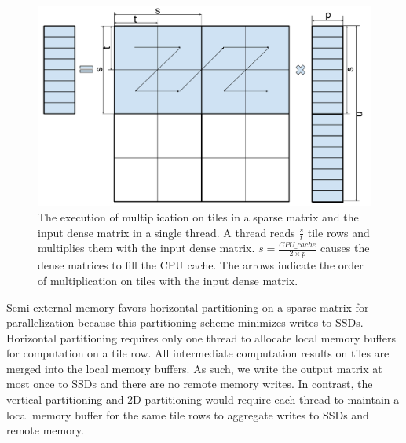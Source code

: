 \begin{figure}
\centering
\includegraphics[scale=0.3]{SpMM_figs/SpMM_exec.pdf}
\caption{The execution of multiplication on tiles in a sparse matrix and
	the input dense matrix in a single thread. A thread reads $\frac{s}{t}$
	tile rows and multiplies them with the input dense matrix.
	$s = \frac{CPU\_cache}{2 \times p}$ causes the dense matrices to fill
	the CPU cache. The arrows indicate the order of multiplication on tiles with the input dense matrix.}
\label{spmm_exec}
\end{figure}

Semi-external memory favors horizontal partitioning on a sparse matrix
for parallelization because this partitioning scheme minimizes writes to SSDs.
Horizontal partitioning
requires only one thread to allocate local memory buffers for computation on
a tile row. All intermediate computation results on tiles are merged into
the local memory buffers. As such, we write the output matrix at most once
to SSDs and there are no remote memory writes.
In contrast, the vertical partitioning and 2D partitioning \cite{Koanantakool16}
would require each thread to maintain a local memory buffer for the same tile rows
to aggregate writes to SSDs and remote memory.

